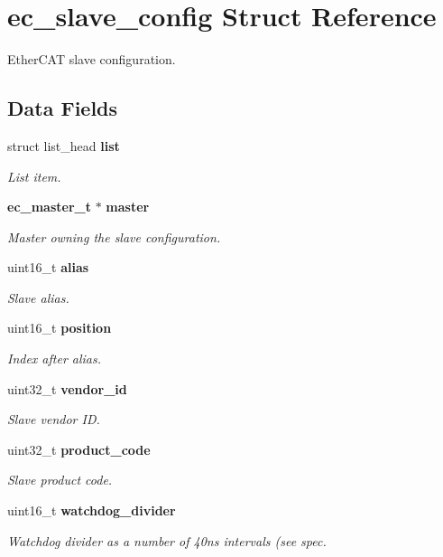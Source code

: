 \section{ec\-\_\-slave\-\_\-config Struct Reference}
\label{structec__slave__config}


Ether\-C\-A\-T slave configuration.  


\subsection*{Data Fields}
\begin{DoxyCompactItemize}
\item 
struct list\-\_\-head {\bf list}
\begin{DoxyCompactList}\small\item\em List item. \end{DoxyCompactList}\item 
{\bf ec\-\_\-master\-\_\-t} $\ast$ {\bf master}
\begin{DoxyCompactList}\small\item\em Master owning the slave configuration. \end{DoxyCompactList}\item 
uint16\-\_\-t {\bf alias}
\begin{DoxyCompactList}\small\item\em Slave alias. \end{DoxyCompactList}\item 
uint16\-\_\-t {\bf position}
\begin{DoxyCompactList}\small\item\em Index after alias. \end{DoxyCompactList}\item 
uint32\-\_\-t {\bf vendor\-\_\-id}
\begin{DoxyCompactList}\small\item\em Slave vendor I\-D. \end{DoxyCompactList}\item 
uint32\-\_\-t {\bf product\-\_\-code}
\begin{DoxyCompactList}\small\item\em Slave product code. \end{DoxyCompactList}\item 
uint16\-\_\-t {\bf watchdog\-\_\-divider}
\begin{DoxyCompactList}\small\item\em Watchdog divider as a number of 40ns intervals (see spec. \end{DoxyCompactList}\item 

\end{DoxyCompactItemize}
